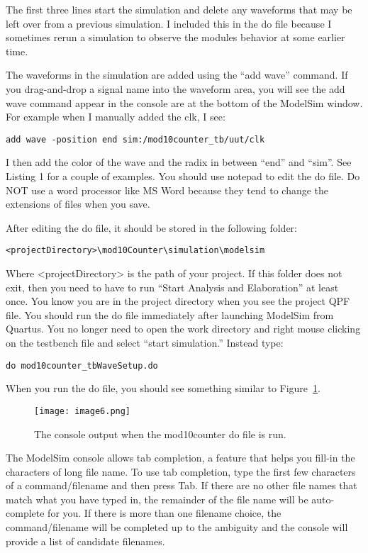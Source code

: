 The first three lines start the simulation and delete any waveforms that
may be left over from a previous simulation. I included this in the do
file because I sometimes rerun a simulation to observe the modules
behavior at some earlier time.

The waveforms in the simulation are added using the ``add wave''
command. If you drag-and-drop a signal name into the waveform area, you
will see the add wave command appear in the console are at the bottom of
the ModelSim window. For example when I manually added the clk, I see:

\begin{verbatim}
add wave -position end sim:/mod10counter_tb/uut/clk
\end{verbatim}

I then add the color of the wave and the radix in between ``end'' and
``sim''. See Listing 1 for a couple of examples. You should use notepad
to edit the do file. Do NOT use a word processor like MS Word because
they tend to change the extensions of files when you save.

After editing the do file, it should be stored in the following folder:

\begin{verbatim}
<projectDirectory>\mod10Counter\simulation\modelsim
\end{verbatim}

Where \textless projectDirectory\textgreater{} is the path of your
project. If this folder does not exit, then you need to have to run
``Start Analysis and Elaboration'' at least once. You know you are in
the project directory when you see the project QPF file. You should run
the do file immediately after launching ModelSim from Quartus. You no
longer need to open the work directory and right mouse clicking on the
testbench file and select ``start simulation.'' Instead type:

\begin{verbatim}
do mod10counter_tbWaveSetup.do
\end{verbatim}

When you run the do file, you should see something similar to Figure~\ref{fig:mod10console}.

\begin{figure}[ht]
\texttt{[image: image6.png]}
\caption{The console output when the mod10counter do file is run.}
\label{fig:mod10console}
\end{figure}

The ModelSim console allows tab completion, a feature that helps you
fill-in the characters of long file name. To use tab completion, type
the first few characters of a command/filename and then press Tab. If
there are no other file names that match what you have typed in, the
remainder of the file name will be auto-complete for you. If there is
more than one filename choice, the command/filename will be completed up
to the ambiguity and the console will provide a list of candidate
filenames.

